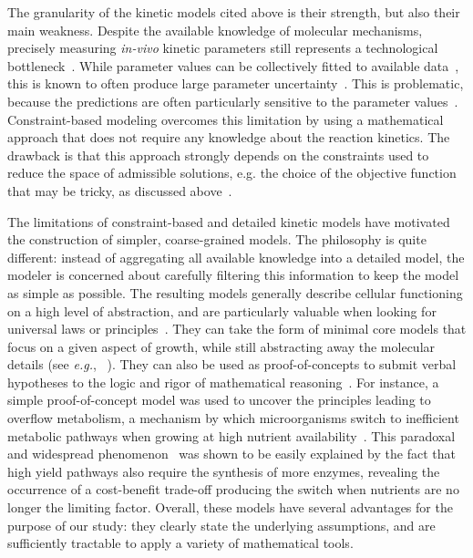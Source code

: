 The granularity of the kinetic models cited above is their strength, but also their main weakness.
Despite the available knowledge of molecular mechanisms, precisely measuring \textit{in-vivo} kinetic parameters still represents a technological bottleneck~\cite{park_metabolite_2016,bennett_absolute_2009,buscher_cross-platform_2009}.
While parameter values can be collectively fitted to available data~\cite{jaqaman_linking_2006,mendes_non-linear_1998}, this is known to often produce large parameter uncertainty~\cite{cho_experimental_2003,brodersen_characterization_1987,rodriguez-fernandez_hybrid_2006}.
This is problematic, because the predictions are often particularly sensitive to the parameter values~\cite{gutenkunst_universally_2007,ingram_network_2006,mayo_plasticity_2006}.
Constraint-based modeling overcomes this limitation by using a mathematical approach that does not require any knowledge about the reaction kinetics.
The drawback is that this approach strongly depends on the constraints used to reduce the space of admissible solutions, e.g. the choice of the objective function that may be tricky, as discussed above~\cite{kauffman_advances_2003}.

The limitations of constraint-based and detailed kinetic models have motivated the construction of simpler, coarse-grained models.
The philosophy is quite different: instead of aggregating all available knowledge into a detailed model, the modeler is concerned about carefully filtering this information to keep the model as simple as possible.
The resulting models generally describe cellular functioning on a high level of abstraction, and are particularly valuable when looking for universal laws or principles~\cite{scott_bacterial_2011,scott_interdependence_2010,scott_emergence_2014}.
They can take the form of minimal core models that focus on a given aspect of growth, while still abstracting away the molecular details (see \textit{e.g.}, ~\cite{spiesser_size_2012}).
They can also be used as proof-of-concepts to submit verbal hypotheses to the logic and rigor of mathematical reasoning~\cite{servedio_not_2014}.
For instance, a simple proof-of-concept model was used to uncover the principles leading to overflow metabolism, a mechanism by which microorganisms switch to inefficient metabolic pathways when growing at high nutrient availability~\cite{molenaar_shifts_2009}.
This paradoxal and widespread phenomenon~\cite{dijken_kinetics_1993,vemuri_overflow_2006,mckeehan_glycolysis_1982,hsu_cancer_2008} was shown to be easily explained by the fact that high yield pathways also require the synthesis of more enzymes, revealing the occurrence of a cost-benefit trade-off producing the switch when nutrients are no longer the limiting factor.
Overall, these models have several advantages for the purpose of our study: they clearly state the underlying assumptions, and are sufficiently tractable to apply a variety of mathematical tools.

